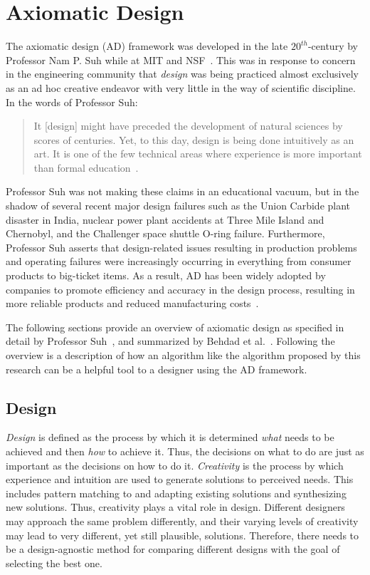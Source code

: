 \section{Axiomatic Design}\label{sec:axiomatic}

The axiomatic design (AD) framework was developed in the late \(20^{th}\)-century by Professor Nam P. Suh while at
MIT and NSF~\cite{suh}.  This was in response to concern in the engineering community that \emph{design} was
being practiced almost exclusively as an ad hoc creative endeavor with very little in the way of scientific
discipline.  In the words of Professor Suh:
\begin{quote}
  \vspace{-\baselineskip}
  It [design] might have preceded the development of natural sciences by scores of centuries.  Yet, to this day,
  design is being done intuitively as an art.  It is one of the few technical areas where experience is more
  important than formal education~\cite{suh}.
\end{quote}
Professor Suh was not making these claims in an educational vacuum, but in the shadow of several recent major
design failures such as the Union Carbide plant disaster in India, nuclear power plant accidents at Three Mile
Island and Chernobyl, and the Challenger space shuttle O-ring failure.  Furthermore, Professor Suh asserts that
design-related issues resulting in production problems and operating failures were increasingly occurring in
everything from consumer products to big-ticket items.  As a result, AD has been widely adopted by companies to
promote efficiency and accuracy in the design process, resulting in more reliable products and reduced
manufacturing costs~\cite{shirwaiker}.

The following sections provide an overview of axiomatic design as specified in detail by Professor
Suh~\cite{suh,suh2}, and summarized by Behdad et al.~\cite{cavallaro,jahanbekam}.  Following the overview is a
description of how an algorithm like the algorithm proposed by this research can be a helpful tool to a designer
using the AD framework.

\subsection{Design}\label{sec:sub:design}

\emph{Design} is defined as the process by which it is determined \emph{what} needs to be achieved and then
\emph{how} to achieve it.  Thus, the decisions on what to do are just as important as the decisions on how to do
it.  \emph{Creativity} is the process by which experience and intuition are used to generate solutions to perceived
needs.  This includes pattern matching to and adapting existing solutions and synthesizing new solutions.  Thus,
creativity plays a vital role in design.  Different designers may approach the same problem differently, and their
varying levels of creativity may lead to very different, yet still plausible, solutions.  Therefore, there needs to
be a design-agnostic method for comparing different designs with the goal of selecting the best one.

